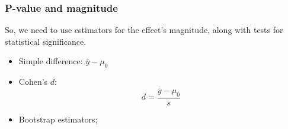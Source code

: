 \documentclass[10pt]{beamer}
\begin{document}
\begin{frame}
  \frametitle{P-value and magnitude}

  \begin{block}{}
    So, we need to use estimators for the effect's magnitude, along
    with tests for statistical significance.
  \end{block}
  \begin{itemize}
  \item Simple difference: $\bar{y} - \mu_0$
  \item Cohen's $d$: 
    \begin{equation*}
      d = \frac{\bar{y} - \mu_0}{s}
    \end{equation*}
  \item Bootstrap estimators;    
  \end{itemize}
\end{frame}
\end{document}

